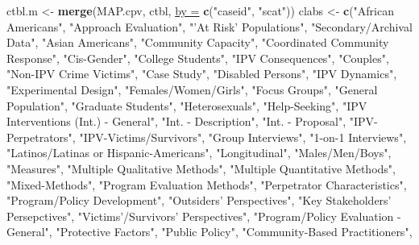 \documentclass[]{tufte-handout}
\newenvironment{Shaded}{}{}
\newcommand{\KeywordTok}[1]{\textbf{{#1}}}
\newcommand{\DataTypeTok}[1]{\underline{{#1}}}
\newcommand{\StringTok}[1]{{#1}}
\newcommand{\NormalTok}[1]{{#1}}
\begin{document}
\begin{Shaded}
\begin{Highlighting}[]
\NormalTok{ctbl.m <-}\StringTok{ }\KeywordTok{merge}\NormalTok{(MAP.cpv, ctbl, }\DataTypeTok{by =} \KeywordTok{c}\NormalTok{(}\StringTok{"caseid"}\NormalTok{, }\StringTok{"scat"}\NormalTok{))}
\NormalTok{clabs <-}\StringTok{ }\KeywordTok{c}\NormalTok{(}\StringTok{"African Americans"}\NormalTok{, }\StringTok{"Approach Evaluation"}\NormalTok{, }\StringTok{"'At Risk' Populations"}\NormalTok{, }
    \StringTok{"Secondary/Archival Data"}\NormalTok{, }\StringTok{"Asian Americans"}\NormalTok{, }\StringTok{"Community Capacity"}\NormalTok{, }
    \StringTok{"Coordinated Community Response"}\NormalTok{, }\StringTok{"Cis-Gender"}\NormalTok{, }\StringTok{"College Students"}\NormalTok{, }
    \StringTok{"IPV Consequences"}\NormalTok{, }\StringTok{"Couples"}\NormalTok{, }\StringTok{"Non-IPV Crime Victims"}\NormalTok{, }\StringTok{"Case Study"}\NormalTok{, }
    \StringTok{"Disabled Persons"}\NormalTok{, }\StringTok{"IPV Dynamics"}\NormalTok{, }\StringTok{"Experimental Design"}\NormalTok{, }
    \StringTok{"Females/Women/Girls"}\NormalTok{, }\StringTok{"Focus Groups"}\NormalTok{, }\StringTok{"General Population"}\NormalTok{, }
    \StringTok{"Graduate Students"}\NormalTok{, }\StringTok{"Heterosexuals"}\NormalTok{, }\StringTok{"Help-Seeking"}\NormalTok{, }\StringTok{"IPV Interventions (Int.) - General"}\NormalTok{, }
    \StringTok{"Int. - Description"}\NormalTok{, }\StringTok{"Int. - Proposal"}\NormalTok{, }\StringTok{"IPV-Perpetrators"}\NormalTok{, }
    \StringTok{"IPV-Victims/Survivors"}\NormalTok{, }\StringTok{"Group Interviews"}\NormalTok{, }\StringTok{"1-on-1 Interviews"}\NormalTok{, }
    \StringTok{"Latinos/Latinas or Hispanic-Americans"}\NormalTok{, }\StringTok{"Longitudinal"}\NormalTok{, }
    \StringTok{"Males/Men/Boys"}\NormalTok{, }\StringTok{"Measures"}\NormalTok{, }\StringTok{"Multiple Qualitative Methods"}\NormalTok{, }
    \StringTok{"Multiple Quantitative Methods"}\NormalTok{, }\StringTok{"Mixed-Methods"}\NormalTok{, }\StringTok{"Program Evaluation Methods"}\NormalTok{, }
    \StringTok{"Perpetrator Characteristics"}\NormalTok{, }\StringTok{"Program/Policy Development"}\NormalTok{, }
    \StringTok{"Outsiders' Perspectives"}\NormalTok{, }\StringTok{"Key Stakeholders' Persepctives"}\NormalTok{, }
    \StringTok{"Victims'/Survivors' Perspectives"}\NormalTok{, }\StringTok{"Program/Policy Evaluation - General"}\NormalTok{, }
    \StringTok{"Protective Factors"}\NormalTok{, }\StringTok{"Public Policy"}\NormalTok{, }\StringTok{"Community-Based Practitioners"}\NormalTok{, }

\end{Highlighting}
\end{Shaded}
\end{document}
